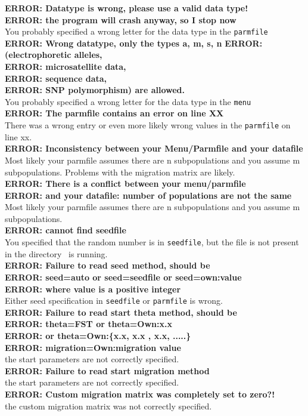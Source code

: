 \smallerskip
{\bf ERROR: Datatype is wrong, please use a valid data type!}\\
{\bf ERROR: the program will crash anyway, so I stop now}\\
You probably specified a wrong letter for the data type in the {\tt parmfile}\\
\smallerskip
{\bf ERROR: Wrong datatype, only the types a, m, s, n} 
{\bf ERROR:         (electrophoretic alleles,}\\
{\bf ERROR:          microsatellite data,}\\
{\bf ERROR:          sequence data,}\\
{\bf ERROR:          SNP polymorphism)  are allowed.} \\
You probably specified a wrong letter for the data type in the {\tt menu}\\
\smallerskip
{\bf ERROR: The parmfile contains an error on line XX}\\
There was a wrong entry or even more likely wrong values in the {\tt parmfile} on line xx.\\
\smallerskip
{\bf ERROR: Inconsistency between your Menu/Parmfile and your datafile}\\
Most likely your parmfile assumes there are n subpopulations and 
you assume m subpopulations. Problems with the migration matrix are likely.\\
\smallerskip
{\bf ERROR: There is a conflict between your menu/parmfile}\\
{\bf ERROR: and your datafile: number of populations are not the same}\\
Most likely your parmfile assumes there are n subpopulations and 
you assume m subpopulations. \\
\smallerskip
{\bf ERROR: cannot find seedfile}\\
You specified that the random number is in {\tt seedfile}, 
but the file is not present
in the directory \migrate\ is running.\\
\smallerskip
{\bf ERROR: Failure to read seed method, should be}\\
{\bf ERROR: seed=auto or seed=seedfile or seed=own:value}\\
{\bf ERROR: where value is a positive integer}\\
Either seed specification in {\tt seedfile} or {\tt parmfile} is wrong.\\
\smallerskip
{\bf ERROR: Failure to read start theta method, should be}\\
{\bf ERROR: theta=FST or theta=Own:x.x}\\
{\bf ERROR: or theta=Own:\{x.x, x.x , x.x, .....\}}\\
{\bf ERROR: migration=Own:{migration value}}\\ 
the start parameters are not correctly specified.\\
\smallerskip
{\bf ERROR: Failure to read start migration method}\\
the start parameters are not correctly specified.\\
\smallerskip
{\bf ERROR: Custom migration matrix was completely set to zero?!}\\
the custom migration matrix was not correctly specified.
